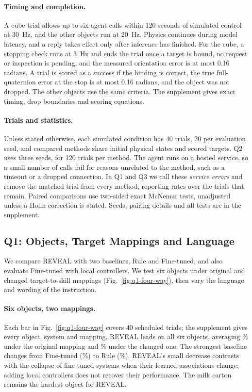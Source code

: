 \paragraph{Timing and completion.}
A cube trial allows up to six agent calls within 120 seconds of simulated control at 30~Hz, and the other objects run at 20~Hz. Physics continues during model latency, and a reply takes effect only after inference has finished. For the cube, a stopping check runs at 3~Hz and ends the trial once a target is bound, no request or inspection is pending, and the measured orientation error is at most 0.16 radians. A trial is scored as a success if the binding is correct, the true full-quaternion error at the stop is at most 0.16 radians, and the object was not dropped. The other objects use the same criteria. The supplement gives exact timing, drop boundaries and scoring equations.

\paragraph{Trials and statistics.}
Unless stated otherwise, each simulated condition has 40 trials, 20 per evaluation seed, and compared methods share initial physical states and scored targets. Q2 uses three seeds, for 120 trials per method. The agent runs on a hosted service, so a small number of calls fail for reasons unrelated to the method, such as a timeout or a dropped connection. In Q1 and Q3 we call these \emph{service errors} and remove the matched trial from every method, reporting rates over the trials that remain. Paired comparisons use two-sided exact McNemar tests, unadjusted unless a Holm correction is stated. Seeds, pairing details and all tests are in the supplement.



\subsection{Q1: Objects, Target Mappings and Language}
We compare REVEAL with two baselines, Rule and Fine-tuned, and also evaluate Fine-tuned with local controllers. We test six objects under original and changed target-to-skill mappings (Fig.~\ref{fig:q1-four-way}), then vary the language and wording of the instruction.

\paragraph{Six objects, two mappings.}
Each bar in Fig.~\ref{fig:q1-four-way} covers 40 scheduled trials; the supplement gives every object, system and mapping. REVEAL leads on all six objects, averaging \QOneOriginalSuccess\% under the original mapping and \QOneChangedSuccess\% under the changed one. The strongest baseline changes from Fine-tuned (\QOneOriginalBaseline\%) to Rule (\QOneChangedBaseline\%). REVEAL's small decrease contrasts with the collapse of fine-tuned systems when their learned associations change; adding local controllers does not recover their performance. The milk carton remains the hardest object for REVEAL.


